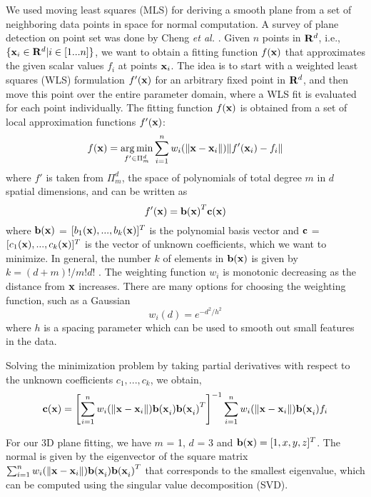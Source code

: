 We used moving least squares (MLS) for deriving a smooth plane
from a set of neighboring data points in space for normal computation.
A survey of plane detection on point set was done by Cheng {\it et al.} \cite{MLS02}.
Given $n$ points in ${\bf R}^d$, i.e., $\{{\bf x}_i \in {\bf R}^d | i \in [1...n]\}$,
we want to obtain a fitting function $f({\bf x})$ that approximates the given scalar
values $f_i$ at points ${\bf x}_i$.
The idea is to start with a weighted least squares (WLS) formulation
$f'({\bf x})$ for an arbitrary fixed point in ${\bf R}^d$,
and then move this point over the entire parameter domain,
where a WLS fit is evaluated for each point individually.
The fitting function $f({\bf x})$ is obtained from a set of local
approximation functions $f'({\bf x})$:
\begin{equation}
f({\bf x}) = \underset{f'\in \Pi_{m}^d}{\operatorname{arg\,min}}
\sum_{i=1}^{n}{w_i(\lVert {\bf x} - {\bf x}_i \lVert)\lVert f'({\bf x}_i) - f_i \lVert}
\end{equation}
where $f'$ is taken from $\Pi_{m}^d$, the space of polynomials of total degree
$m$ in $d$ spatial dimensions, and can be written as
\begin{equation}
f'({\bf x}) = {\bf b(x)}^T{\bf c(x)}
\end{equation}
where ${\bf b(x)}$ = $[b_1({\bf x}),..., b_k({\bf x})]^T$ is the polynomial basis vector
and ${\bf c}$ = $[c_1({\bf x}),...,c_k({\bf x})]^T$ is the vector of unknown coefficients,
which we want to minimize.
In general, the number $k$ of elements in ${\bf b(x)}$ is given by
$k = (d+m)!/m!d!$ \cite{MLS01}.
The weighting function $w_i$ is monotonic decreasing as the distance from ${\bf x}$ increases.
There are many options for choosing the weighting function, such as a Gaussian
\begin{equation}
w_i(d) = e^{-d^2/h^2}
\end{equation}
where $h$ is a spacing parameter which can be used to smooth out small features in the data.

Solving the minimization problem by taking partial derivatives with respect to
the unknown coefficients $c_1,...,c_k$, we obtain,
\begin{equation}
{\bf c(x)} = \left[\sum_{i=1}^{n}{w_i(\lVert {\bf x} - {\bf x}_i \lVert)
{\bf b(x}_i{\bf )}{\bf b(x}_i{\bf )}^T}\right]^{-1}
\sum_{i=1}^{n}{w_i(\lVert {\bf x} - {\bf x}_i \lVert){\bf b(x}_i{\bf )}}f_i
\end{equation}

For our 3D plane fitting, we have $m$ = 1, $d$ = 3 and ${\bf b(x)} = [1, x, y, z]^T$.
The normal is given by the eigenvector of the square matrix
$\sum_{i=1}^{n}{w_i(\lVert {\bf x} - {\bf x}_i \lVert)
{\bf b(x}_i{\bf )}{\bf b(x}_i{\bf )}^T}$
that corresponds to the smallest eigenvalue,
which can be computed using the singular value decomposition (SVD).

